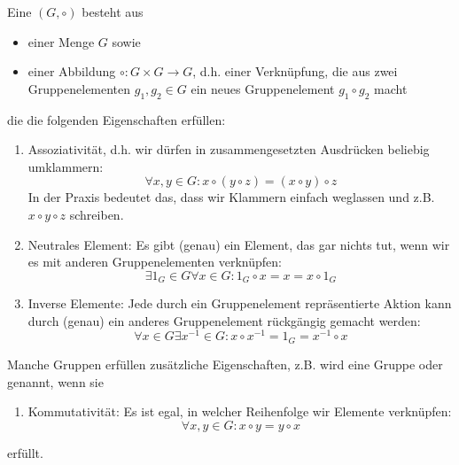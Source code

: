 \begin{definition}
Eine  $(G,\circ)$ besteht aus
\begin{itemize}
\item einer Menge $G$ sowie
\item einer Abbildung $\circ: G\times G\to G$, d.h. einer Verknüpfung, die aus zwei Gruppenelementen $g_1,g_2\in G$ ein neues Gruppenelement $g_1\circ g_2$ macht
\end{itemize}
die die folgenden Eigenschaften erfüllen:
\begin{enumerate}[label=(G\arabic*)]
\item Assoziativität, d.h. wir dürfen in zusammengesetzten Ausdrücken beliebig umklammern:
\[\forall x,y\in G: x\circ(y\circ z) = (x\circ y)\circ z\]
In der Praxis bedeutet das, dass wir Klammern einfach weglassen und z.B. $x\circ y\circ z$ schreiben.
\item Neutrales Element: Es gibt (genau) ein Element, das gar nichts tut, wenn wir es mit anderen Gruppenelementen verknüpfen:
\[\exists 1_G\in G \forall x\in G: 1_G\circ x = x = x\circ 1_G\]
\item Inverse Elemente: Jede durch ein Gruppenelement repräsentierte Aktion kann durch (genau) ein anderes Gruppenelement rückgängig gemacht werden:
\[\forall x\in G\exists x^{-1}\in G: x\circ x^{-1}=1_G=x^{-1}\circ x\]
\end{enumerate}
Manche Gruppen erfüllen zusätzliche Eigenschaften, z.B. wird eine Gruppe  oder  genannt, wenn sie
\begin{enumerate}[label=(G\arabic*),resume]
\item Kommutativität: Es ist egal, in welcher Reihenfolge wir Elemente verknüpfen:
\[\forall x,y\in G: x\circ y = y\circ x\]
\end{enumerate}
erfüllt.
\end{definition}

